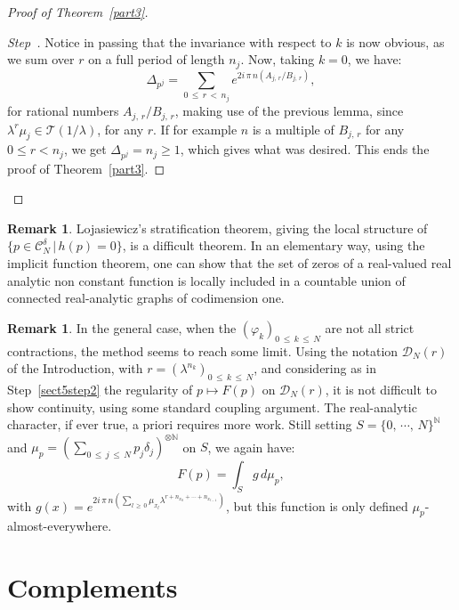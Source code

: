 \documentclass[10pt]{amsart}
\theoremstyle{definition}\newtheorem{defi}[theo]{Definition}\newtheorem{rema}[theo]{Remark}\newtheorem{exam}[theo]{Example}\newtheorem{exem}[theo]{Example}\newtheorem{nota}[theo]{Notation}
\newcommand{\Nbb}{\mathbb N}
\newcommand{\Ccl}{\mathcal{C}}
\newcommand{\Dcl}{\mathcal{D}}
\newcommand{\Tcl}{\mathcal{T}}
\newcounter{stepcount}
\newenvironment{step}{\refstepcounter{stepcount}\begin{proof}[Step~\thestepcount]}{\let\qed\relax\end{proof}}
\begin{document}
\begin{proof}[{Proof of Theorem~\ref{part3}}]
\begin{step}
Notice in passing that the invariance with respect to $k$ is now obvious, as we sum over $r$ on a full period of length $n_j$. Now, taking $k=0$, we have:
\[
\Delta_{p^j}=\sum_{0\,\leq\,r\,<\,n_j}e^{2i\,\pi\, n(A_{j,\,r}/B_{j,\,r})},
\]
for rational numbers $A_{j,\,r}/B_{j,\,r}$, making use of the previous lemma, since $\lambda^r\mu_j\in{\Tcl}(1/\lambda)$, for any $r$. If for example $n$ is a multiple of $B_{j,\,r}$ for any $0\leq r<n_j$, we get $\Delta_{p^j}=n_j\geq1$, which gives what was desired. This ends the proof of Theorem~\ref{part3}.\qedhere
\end{step}\let\qed\relax
\end{proof}


\begin{rema}
Lojasiewicz's stratification theorem, giving the local structure of $\{p\in{\Ccl}^{\delta}_N\,|\,h(p)=0\}$, is a difficult theorem. In an elementary way, using the implicit function theorem, one can show that the set of zeros of a real-valued real analytic non constant function is locally included in a countable union of connected real-analytic graphs of codimension one.
\end{rema}

\begin{rema}
In the general case, when the $(\varphi_k)_{0\,\leq\, k\,\leq\,N}$ are not all strict contractions, the method seems to reach some limit. Using the notation ${\Dcl}_N(r)$ of the Introduction, with $r=(\lambda^{n_k})_{0\,\leq\,k\,\leq\,N}$, and considering as in Step~\ref{sect5step2} the regularity of $p\longmapsto F(p)$ on ${\Dcl}_N(r)$, it is not difficult to show continuity, using some standard coupling argument. The real-analytic character, if ever true, a priori requires more work. Still setting $S=\{0,\,\cdots,\,N\}^{\Nbb}$ and $\mu_p=(\sum_{0\,\leq\,j\,\leq\,N}p_j\delta_j)^{\otimes\Nbb}$ on $S$, we again have:
\[
F(p)=\int_{S}g\,d\mu_p,
\]
with $g(x)=e^{2i\,\pi\,n({\sum_{l\,\geq\,0}\mu_{x_l}\lambda^{r+n_{x_0}+\cdots+n_{x_{l-1}}}})}$, but this function is only defined $\mu_p$-almost-everywhere.
\end{rema}



\section{Complements}
\end{document}

